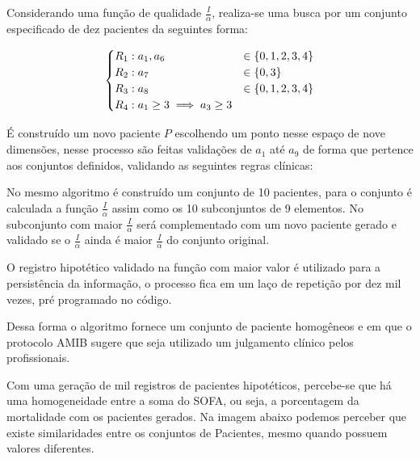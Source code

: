 \documentclass[12pt]{article}
\begin{document}
Considerando uma função de qualidade $\frac{I}{\alpha}$, realiza-se uma busca por um conjunto especificado de dez pacientes da seguintes forma:


\[
\begin{split}
    \begin{cases}
    R_1: a_1 , a_6 &\in \{0, 1, 2, 3, 4\} \\
    R_2: a_7 &\in \{0, 3\} \\
    R_3: a_8 &\in \{0, 1, 2, 3, 4\} \\
    R_4: a_1 \ge 3 \implies a_3 \ge 3 \\
    \end{cases}
\end{split}
\]

É construído um novo paciente $P$ escolhendo um ponto nesse espaço de nove dimensões, nesse processo são feitas validações de $a_1$ até $a_9$ de forma que pertence aos conjuntos definidos, validando as seguintes regras clínicas:


No mesmo algoritmo é construído um conjunto de 10 pacientes, para o conjunto é calculada a função $\frac{I}{\alpha}$ assim como os 10 subconjuntos de 9 elementos.
No subconjunto com maior $\frac{I}{\alpha}$ será complementado com um novo paciente gerado e validado se o $\frac{I}{\alpha}$ ainda é maior $\frac{I}{\alpha}$ do conjunto original.

O registro hipotético validado na função com maior valor é utilizado para a persistência da informação, o processo fica em um laço de repetição por dez mil vezes, pré programado no código.

Dessa forma o algoritmo fornece um conjunto de paciente homogêneos e em que o protocolo AMIB sugere que seja utilizado um julgamento clínico pelos profissionais.


Com uma geração de mil registros de pacientes hipotéticos, percebe-se que há uma homogeneidade entre a soma do SOFA, ou seja, a porcentagem da mortalidade com os pacientes gerados. Na imagem abaixo podemos perceber que existe similaridades entre os conjuntos de Pacientes, mesmo quando possuem valores diferentes.
\end{document}
